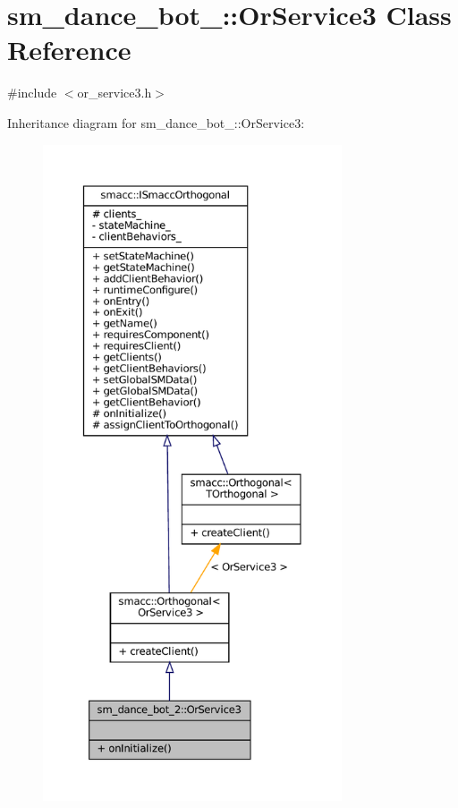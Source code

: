 \hypertarget{classsm__dance__bot__2_1_1OrService3}{}\section{sm\+\_\+dance\+\_\+bot\+\_\+:\+:Or\+Service3 Class Reference}
\label{classsm__dance__bot__2_1_1OrService3}


{\ttfamily \#include $<$or\+\_\+service3.\+h$>$}



Inheritance diagram for sm\+\_\+dance\+\_\+bot\+\_\+:\+:Or\+Service3\+:
\nopagebreak
\begin{figure}[H]
\begin{center}
\leavevmode
\includegraphics[height=550pt]{classsm__dance__bot__2_1_1OrService3__inherit__graph}
\end{center}
\end{figure}


